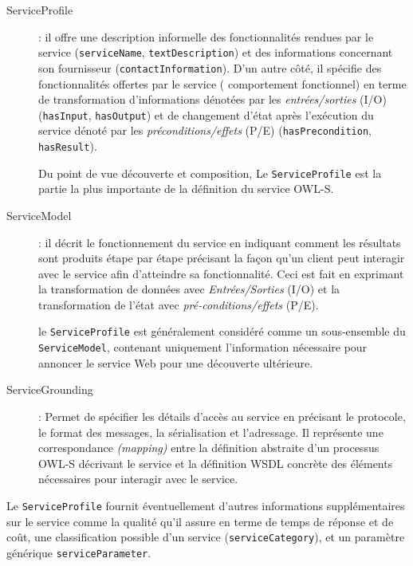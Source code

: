    \renewcommand{\descriptionlabel}[1]{\hspace{0.5cm}\textbullet~\texttt{#1}}
    \begin{description}
    \item[ServiceProfile]: il offre une description informelle des
      fonctionnalités rendues par le service (\verb|serviceName|,
      \verb|textDescription|) et des informations concernant son
      fournisseur (\verb|contactInformation|). D'un autre côté, il
      spécifie des fonctionnalités offertes par le service (
      comportement fonctionnel) en terme de transformation
      d'informations dénotées par les \textit{entrées/sorties}
      \textsc{(I/O)} (\verb|hasInput|, \verb|hasOutput|) et de
      changement d'état après l'exécution du service dénoté par les
      \textit{préconditions/effets} \textsc{(P/E)}
      (\verb|hasPrecondition|, \verb|hasResult|).\medskip

      Du point de vue découverte et composition, Le
      \verb|ServiceProfile| est la partie la plus importante de la
      définition du service \textsc{OWL-S}.

    \item[ServiceModel]: il décrit le fonctionnement du service en
      indiquant comment les résultats sont produits étape par étape
      précisant la façon qu'un client peut interagir avec le service
      afin d'atteindre sa fonctionnalité. Ceci est fait en exprimant
      la transformation de données avec \textit{Entrées/Sorties}
      \textsc{(I/O)} et la transformation de l'état avec
      \textit{pré-conditions/effets} \textsc{(P/E)}.\medskip

      le \verb|ServiceProfile| est généralement considéré comme un
      sous-ensemble du \verb|ServiceModel|, contenant uniquement
      l'information nécessaire pour annoncer le service Web pour une
      découverte ultérieure.

    \item[ServiceGrounding]: Permet de spécifier les détails d'accès
      au service en précisant le protocole, le format des messages, la
      sérialisation et l'adressage. Il représente une correspondance
      \textit{(mapping)} entre la définition abstraite d'un processus
      \textsc{OWL-S} décrivant le service et la définition
      \textsc{WSDL} concrète des éléments nécessaires pour interagir
      avec le service.
    \end{description}
    \enddescription

    Le \verb|ServiceProfile| fournit éventuellement d'autres
    informations supplémentaires sur le service comme la qualité qu'il
    assure en terme de temps de réponse et de coût, une classification
    possible d'un service (\verb|serviceCategory|), et un paramètre
    générique \verb|serviceParameter|.

